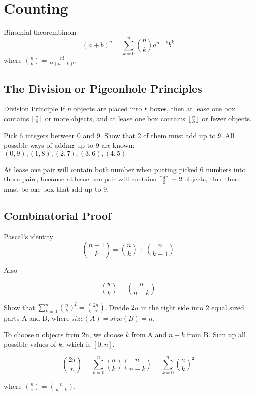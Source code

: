 \section{Counting}
\begin{fact}{Binomial theorem}{binom}
  \[
  (a+b)^n = \sum_{k=0}^n \binom{n}{k} a^{n-k}b^k
  \]
  where $\binom{n}{k} = \frac{n!}{k!(n-k)!}$.
\end{fact}

\subsection{The Division or Pigeonhole Principles}

\begin{fact}{Division Principle}{}
  If $n$ objects are placed into $k$ boxes,
  then at lease one box contains $\lceil\frac{n}{k}\rceil$ or more objects,
  and at lease one box contains $\lfloor\frac{n}{k}\rfloor$ or fewer objects.
\end{fact}

\begin{exec}
  Pick 6 integers between 0 and 9. Show that 2 of them must add up to 9.
  \tcblower
  All possible ways of adding up to 9 are known:
  $(0,9),(1,8),(2,7),(3,6),(4,5)$

  At lease one pair will contain both number when putting picked 6 numbers into those pairs, because at lease one pair will contains $\lceil\frac{9}{6}\rceil=2$ objects, thus there must be one box that add up to 9.
\end{exec}

\subsection{Combinatorial Proof}

\begin{fact}{Pascal’s identity}{}
  \[
  \binom{n+1}{k} = \binom{n}{k} + \binom{n}{k-1}
  \]
\end{fact}

Also

\[
{n \choose k} = {n \choose n-k}
\]

\begin{exec}
  Show that $\sum_{k=0}^{n}{n \choose k}^2 = {2n \choose n}.$
  \tcblower
  Divide $2n$ in the right side into 2 equal sized parts A and B, where $size(A)=size(B)=n$.

  To choose n objects from 2n, we choose $k$ from A and $n-k$ from B.
  Sum up all possible values of $k$, which is $[0,n]$.

  \[
  {2n \choose n} = \sum_{k=0}^{n}{n \choose k}{n \choose n-k} = \sum_{k=0}^{n}{n \choose k}^2
  \]

  where ${n \choose i} = {n \choose n-k}$.
\end{exec}

